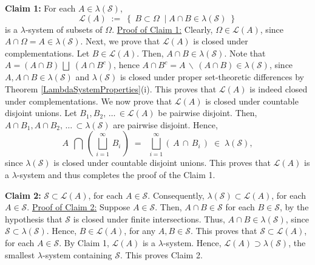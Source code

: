 	\vskip 0.5cm
	\begin{center}
	\begin{minipage}{6.5in}
	\textbf{Claim 1:}\quad
	For each $A \in \lambda\!\left(\mathcal{S}\right)$,
	$$\mathcal{L}(A) \; := \; \left\{\;B \subset \Omega\;\;\vert\; A \cap B \in \lambda(\mathcal{S})\;\right\}$$
	is a $\lambda$-system of subsets of $\Omega$.
	\vskip 0.1cm
	\noindent
	\underline{Proof of Claim 1:}\quad
	Clearly, $\Omega \in \mathcal{L}(A)$, since $A \cap \Omega = A \in \lambda(\mathcal{S})$.
	Next, we prove that $\mathcal{L}(A)$ is closed under complementations.
	Let $B \in \mathcal{L}(A)$. Then, $A \cap B \in \lambda(\mathcal{S})$.
	Note that $A = (A \cap B) \,\bigsqcup\; (A \cap B^{c})$, hence
	$A \cap B^{c} = A \,\backslash\,(A \cap B) \in \lambda(\mathcal{S})$,
	since $A, A \cap B \in \lambda(\mathcal{S})$ and $\lambda(\mathcal{S})$ is closed under proper set-theoretic
	differences by Theorem \ref{LambdaSystemProperties}(i).
	This proves that $\mathcal{L}(A)$ is indeed closed under complementations.
	We now prove that $\mathcal{L}(A)$ is closed under countable disjoint unions.
	Let $B_{1}, B_{2}, \,\ldots\, \in \mathcal{L}(A)$ be pairwise disjoint.
	Then, $A \cap B_{1}, A \cap B_{2}, \,\ldots\, \subset \lambda\!\left(\mathcal{S}\right)$ are pairwise disjoint.
	Hence,
	\begin{equation*}
	A\;\,\bigcap\,\left(\,\bigsqcup_{i=1}^{\infty}\,B_{i}\,\right)
	\; = \;\; \bigsqcup_{i=1}^{\infty} \left(\,A\,\cap\,B_{i}\,\right)
	\; \in \; \lambda\!\left(\mathcal{S}\right),
	\end{equation*}
	since $\lambda\!\left(\mathcal{S}\right)$ is closed under countable disjoint unions.
	This proves that $\mathcal{L}(A)$ is a $\lambda$-system and
	thus completes the proof of the Claim 1.
	\end{minipage}
	\end{center}

	\vskip 0.5cm
	\begin{center}
	\begin{minipage}{6.5in}
	\textbf{Claim 2:}\quad
	$\mathcal{S} \subset \mathcal{L}(A)$, for each $A \in \mathcal{S}$.
	Consequently, $\lambda\!\left(\mathcal{S}\right) \subset \mathcal{L}(A)$, for each $A \in \mathcal{S}$.
	\vskip 0.1cm
	\noindent
	\underline{Proof of Claim 2:}\quad
	Suppose $A \in \mathcal{S}$.
	Then, $A \cap B \in \mathcal{S}$ for each $B \in \mathcal{S}$,
	{\color{red}by the hypothesis that $\mathcal{S}$ is closed under finite intersections}.
	Thus, $A \cap B \in \lambda(\mathcal{S})$,
	since $\mathcal{S} \subset \lambda(\mathcal{S})$.
	Hence, $B \in \mathcal{L}(A)$, for any $A, B \in \mathcal{S}$.
	This proves that $\mathcal{S} \subset \mathcal{L}(A)$, for each $A \in \mathcal{S}$.
	By Claim 1, $\mathcal{L}(A)$ is a $\lambda$-system.
	Hence, $\mathcal{L}(A) \supset \lambda(\mathcal{S})$, the smallest $\lambda$-system containing $\mathcal{S}$.
	This proves Claim 2.
	\end{minipage}
	\end{center}

